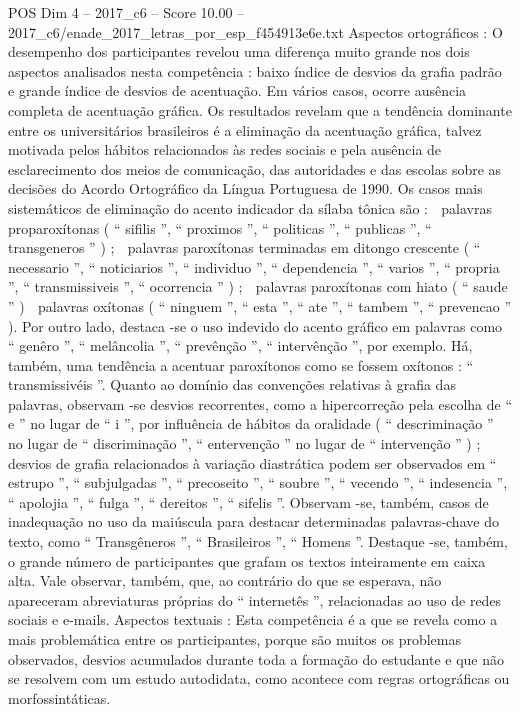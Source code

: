 \begin{textsample}{POS Dim 4 – 2017\_c6 – Score 10.00 – 2017\_c6/enade\_2017\_letras\_por\_esp\_f454913e6e.txt}
Aspectos ortográficos : O desempenho dos participantes revelou uma diferença muito grande nos dois aspectos analisados nesta competência : baixo índice de desvios da grafia padrão e grande índice de desvios de acentuação.
Em vários casos, ocorre ausência completa de acentuação gráfica.
Os resultados revelam que a tendência dominante entre os universitários brasileiros é a eliminação da acentuação gráfica, talvez motivada pelos hábitos relacionados às redes sociais e pela ausência de esclarecimento dos meios de comunicação, das autoridades e das escolas sobre as decisões do Acordo Ortográfico da Língua Portuguesa de 1990.
Os casos mais sistemáticos de eliminação do acento indicador da sílaba tônica são :  palavras proparoxítonas ( “ sifilis ”, “ proximos ”, “ politicas ”, “ publicas ”, “ transgeneros ” ) ;  palavras paroxítonas terminadas em ditongo crescente ( “ necessario ”, “ noticiarios ”, “ individuo ”, “ dependencia ”, “ varios ”, “ propria ”, “ transmissiveis ”, “ ocorrencia ” ) ;  palavras paroxítonas com hiato ( “ saude ” )  palavras oxítonas ( “ ninguem ”, “ esta ”, “ ate ”, “ tambem ”, “ prevencao ” ).
Por outro lado, destaca -se o uso indevido do acento gráfico em palavras como “ genêro ”, “ melâncolia ”, “ prevênção ”, “ intervênção ”, por exemplo.
Há, também, uma tendência a acentuar paroxítonos como se fossem oxítonos : “ transmissivéis ”.
Quanto ao domínio das convenções relativas à grafia das palavras, observam -se desvios recorrentes, como a hipercorreção pela escolha de “ e ” no lugar de “ i ”, por influência de hábitos da oralidade ( “ descriminação ” no lugar de “ discriminação ”, “ entervenção ” no lugar de “ intervenção ” ) ; desvios de grafia relacionados à variação diastrática podem ser observados em “ estrupo ”, “ subjulgadas ”, “ precoseito ”, “ soubre ”, “ vecendo ”, “ indesencia ”, “ apolojia ”, “ fulga ”, “ dereitos ”, “ sifelis ”.
Observam -se, também, casos de inadequação no uso da maiúscula para destacar determinadas palavras-chave do texto, como “ Transgêneros ”, “ Brasileiros ”, “ Homens ”.
Destaque -se, também, o grande número de participantes que grafam os textos inteiramente em caixa alta.
Vale observar, também, que, ao contrário do que se esperava, não apareceram abreviaturas próprias do “ internetês ”, relacionadas ao uso de redes sociais e e-mails.
Aspectos textuais : Esta competência é a que se revela como a mais problemática entre os participantes, porque são muitos os problemas observados, desvios acumulados durante toda a formação do estudante e que não se resolvem com um estudo autodidata, como acontece com regras ortográficas ou morfossintáticas.

\end{textsample}
